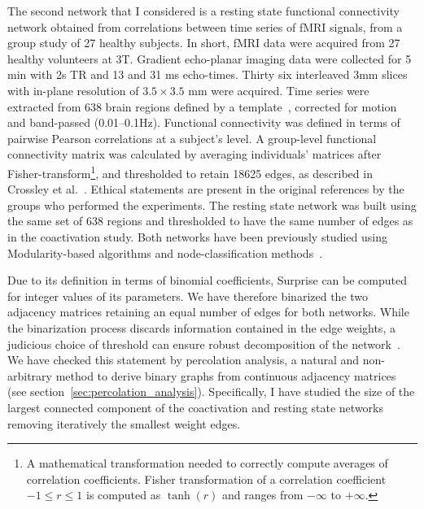 The second network that I considered is a resting state functional connectivity network obtained from correlations between time series of fMRI signals, from a group study of 27 healthy subjects. In short, fMRI data were acquired from 27 healthy volunteers at 3T. Gradient echo-planar imaging data were collected for 5 min with 2s TR and 13 and 31 ms echo-times. Thirty six interleaved 3mm slices with in-plane resolution of $3.5\times 3.5$ mm were acquired. 
Time series were extracted from 638 brain regions defined by a template~\cite{crossley2013a}, corrected for motion and band-passed (0.01–0.1Hz).
Functional connectivity was defined in terms of pairwise Pearson correlations at a subject's level.
A group-level functional connectivity matrix was calculated by averaging individuals' matrices after Fisher-transform\footnote{A mathematical transformation needed to correctly compute averages of correlation coefficients. Fisher transformation of a correlation coefficient $-1 \leq r \leq 1$ is computed as $\tanh(r)$ and ranges from $-\infty$ to $+\infty$.}, and thresholded to retain 18625 edges, as described in Crossley et al.~\cite{crossley2013a}.
Ethical statements are present in the original references by the groups who performed the experiments. 
The resting state network was built using the same set of 638 regions and thresholded to have the same number of edges as in the coactivation study.
Both networks have been previously studied using Modularity-based algorithms and node-classification methods~\cite{crossley2013a}.

Due to its definition in terms of binomial coefficients, Surprise can be computed for integer values of its parameters.
We have therefore binarized the two adjacency matrices retaining an equal number of edges for both networks.
While the binarization process discards information contained in the edge weights, a judicious choice of threshold can ensure robust decomposition of the network~\cite{meunier2010,he2009}.
We have checked this statement by percolation analysis, a natural and non-arbitrary method to derive binary graphs from continuous adjacency matrices (see section~\ref{sec:percolation_analysis}).
Specifically, I have studied the size of the largest connected component of the coactivation and resting state networks removing iteratively the smallest weight edges.

